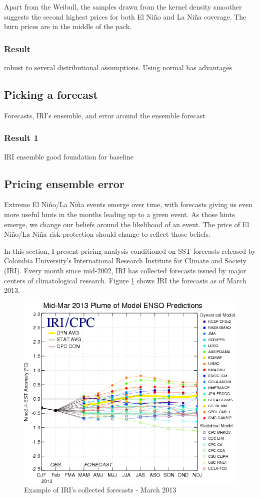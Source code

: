\documentclass[authoryear]{article}
\begin{document}
Apart from the Weibull, the samples drawn from the kernel density smoother suggests the second highest prices for both El Ni\~no and La Ni\~na coverage. The burn prices are in the middle of the pack.
\subsubsection{Result}
robust to several distributional assumptions. 
Using normal has advantages

\subsection{Picking a forecast}
Forecasts, IRI’s ensemble, and error around the ensemble forecast
\subsubsection{Result 1}
IRI ensemble good foundation for baseline

\subsection{Pricing ensemble error}

Extreme El Ni\~no/La Ni\~na events emerge over time, with forecasts giving us even more useful hints in the months leading up to a given event. As those hints emerge, we change our beliefs around the likelihood of an event. The price of El Ni\~no/La Ni\~na risk protection should change to reflect those beliefs.

In this section, I present pricing analysis conditioned on SST forecasts released by Colombia University's International Research Institute for Climate and Society (IRI). Every month since mid-2002, IRI has collected forecasts issued by major centers of climatological research. Figure \ref{fig:forecastExamples} shows IRI the forecasts as of March 2013.

\begin{figure}[!htbp]
  \includegraphics[width=\linewidth]{Pricingfigs/SST_table_march_ex}
  \caption{Example of IRI's collected forecasts - March 2013}
   \label{fig:forecastExamples}
\end{figure}
\end{document}
